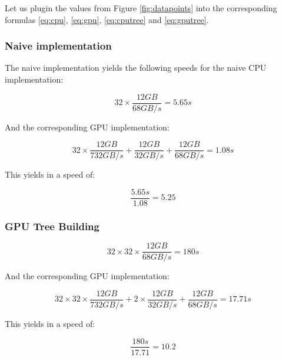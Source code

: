 \documentclass[]{article}
\begin{document}
Let us plugin the values from Figure \ref{fig:datapoints} into the corresponding formulas \ref{eq:cpu}, \ref{eq:gpu}, \ref{eq:cputree} and \ref{eq:gputree}.

\subsubsection{Naive implementation}
The naive implementation yields the following speeds for the naive CPU  implementation:

\begin{center}
	\begin{equation}
		32 \times \frac{ 12 GB }{68 GB/s} = 5.65s
	\end{equation}
\end{center}

And the corresponding GPU implementation:
\begin{center}
	\begin{equation}
		32 \times \frac{12 GB}{732 GB/s} + \frac{12 GB}{32 GB/s}  + \frac{12 GB}{68 GB/s} = 1.08s
	\end{equation}
\end{center}

This yields in a speed of:
\begin{center}
	\begin{equation}
		\frac{5.65s}{1.08} = 5.25
	\end{equation}
\end{center}


\subsubsection{GPU Tree Building}

\begin{center}
	\begin{equation}
		32 \times 32 \times \frac{ 12 GB }{68 GB/s} = 180s
	\end{equation}
\end{center}

And the corresponding GPU implementation:
\begin{center}
	\begin{equation}
		32 \times 32 \times \frac{12 GB}{732 GB/s} + 2 \times \frac{12 GB}{32 GB/s}  + \frac{12 GB}{68 GB/s} = 17.71s
	\end{equation}
\end{center}

This yields in a speed of:
\begin{center}
	\begin{equation}
		\frac{180s}{17.71} = 10.2
	\end{equation}
\end{center}
\end{document}
